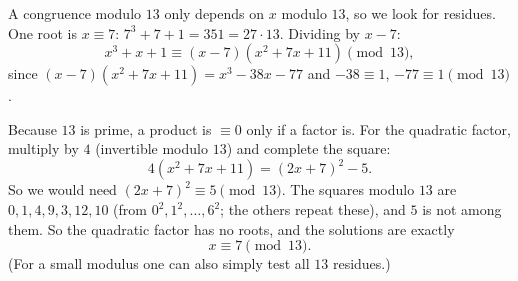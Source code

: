 A congruence modulo $13$ only depends on $x$ modulo $13$, so we look for residues. One root is $x\equiv7$: $7^3+7+1=351=27\cdot13$. Dividing by $x-7$:
\[x^3+x+1\equiv(x-7)\left(x^2+7x+11\right)\pmod{13},\]
since $(x-7)\left(x^2+7x+11\right)=x^3-38x-77$ and $-38\equiv1$, $-77\equiv1\pmod{13}$.

Because $13$ is prime, a product is $\equiv0$ only if a factor is. For the quadratic factor, multiply by $4$ (invertible modulo $13$) and complete the square:
\[4\left(x^2+7x+11\right)=(2x+7)^2-5.\]
So we would need $(2x+7)^2\equiv5\pmod{13}$. The squares modulo $13$ are $0,1,4,9,3,12,10$ (from $0^2,1^2,\dots,6^2$; the others repeat these), and $5$ is not among them. So the quadratic factor has no roots, and the solutions are exactly
\[\boxed{x\equiv7\pmod{13}}.\]
(For a small modulus one can also simply test all $13$ residues.)
